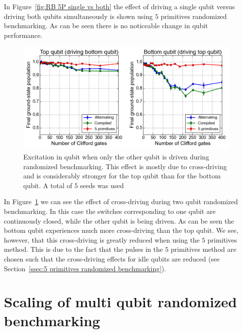           In Figure~\ref{fig:RB 5P single vs both} the effect of driving a single qubit versus driving both qubits simultaneously is shown using $5$ primitives randomized benchmarking. As can be seen there is no noticeable change in qubit performance.

          \begin{figure}[tb]
            \centering
            \includegraphics[width=\textwidth]{../Figures/Randomized benchmarking/RB_2Q_driving_single_vs_both.png}
            \caption{Excitation in qubit when only the other qubit is driven during randomized benchmarking. This effect is mostly due to cross-driving and is considerably stronger for the top qubit than for the bottom qubit. A total of $5$ seeds was used}
            \label{fig:cross driving two qubit randomized benchmarking}
          \end{figure}

          In Figure~\ref{fig:cross driving two qubit randomized benchmarking} we can see the effect of cross-driving during two qubit randomized benchmarking. In this case the switches corresponding to one qubit are continuously closed, while the other qubit is being driven. As can be seen the bottom qubit experiences much more cross-driving than the top qubit. We see, however, that this cross-driving is greatly reduced when using the $5$ primitives method. This is due to the fact that the pulses in the $5$ primitives method are chosen such that the cross-driving effects for idle qubits are reduced (see Section~\ref{ssec:5 primitives randomized benchmarking}).

        \section{Scaling of multi qubit randomized benchmarking}
          \label{sec:scaling of multi qubit randomized benchmarking}

